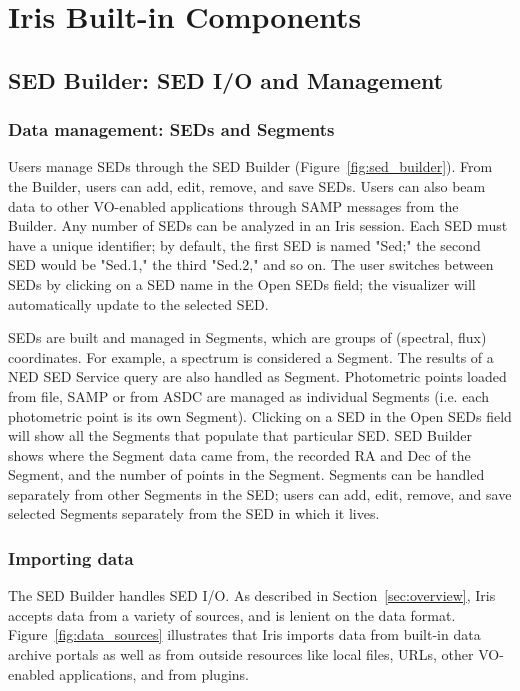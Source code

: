 \section{Iris Built-in Components}
\label{sec:components}

\subsection{SED Builder: SED I/O and Management}
\subsubsection{Data management: SEDs and Segments}
Users manage SEDs through the SED Builder (Figure~\ref{fig:sed_builder}). From the Builder, users can add, edit, remove, and save SEDs. Users can also beam data to other VO-enabled applications through SAMP messages from the Builder. Any number of SEDs can be analyzed in an Iris session. Each SED must have a unique identifier; by default, the first SED is named "Sed;" the second SED would be "Sed.1," the third "Sed.2," and so on. The user switches between SEDs by clicking on a SED name in the Open SEDs field; the visualizer will automatically update to the selected SED. 

SEDs are built and managed in Segments, which are groups of (spectral, flux) coordinates. For example, a spectrum is considered a Segment. The results of a NED SED Service query are also handled as Segment. Photometric points loaded from file, SAMP or from ASDC are managed as individual Segments (i.e. each photometric point is its own Segment). Clicking on a SED in the Open SEDs field will show all the Segments that populate that particular SED. SED Builder shows where the Segment data came from, the recorded RA and Dec of the Segment, and the number of points in the Segment. Segments can be handled separately from other Segments in the SED; users can add, edit, remove, and save selected Segments separately from the SED in which it lives. 

\subsubsection{Importing data}
The SED Builder handles SED I/O. As described in Section~\ref{sec:overview}, Iris accepts data from a variety of sources, and is lenient on the data format. Figure~\ref{fig:data_sources} illustrates that Iris imports data from built-in data archive portals as well as from outside resources like local files, URLs, other VO-enabled applications, and from plugins.

